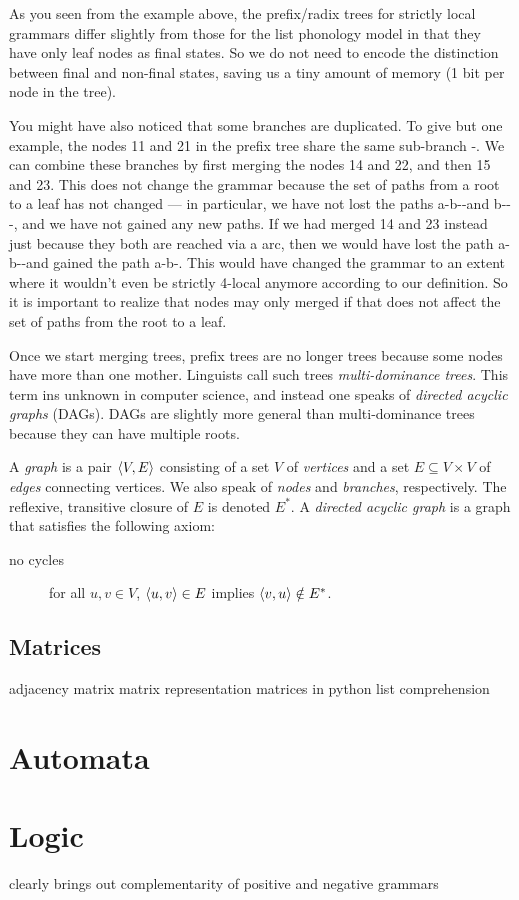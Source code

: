 As you seen from the example above, the prefix\slash radix trees for strictly local grammars differ slightly from those for the list phonology model in that they have only leaf nodes as final states.
So we do not need to encode the distinction between final and non-final states, saving us a tiny amount of memory (1 bit per node in the tree).

You might have also noticed that some branches are duplicated.
To give but one example, the nodes 11 and 21 in the prefix tree share the same sub-branch \RightEdge-\RightEdge.
We can combine these branches by first merging the nodes 14 and 22, and then 15 and 23.
This does not change the grammar because the set of paths from a root to a leaf has not changed --- in particular, we have not lost the paths a-b-\RightEdge-\RightEdge and b-\RightEdge-\RightEdge-\RightEdge, and we have not gained any new paths.
If we had merged 14 and 23 instead just because they both are reached via a \RightEdge arc, then we would have lost the path a-b-\RightEdge-\RightEdge and gained the path a-b-\RightEdge.
This would have changed the grammar to an extent where it wouldn't even be strictly 4-local anymore according to our definition.
So it is important to realize that nodes may only merged if that does not affect the set of paths from the root to a leaf.
%
\begin{examplebox}
    
\end{examplebox}

Once we start merging trees, prefix trees are no longer trees because some nodes have more than one mother.
Linguists call such trees \emph{multi-dominance trees}.
This term ins unknown in computer science, and instead one speaks of \emph{directed acyclic graphs} (DAGs).
DAGs are slightly more general than multi-dominance trees because they can have multiple roots.
%
\begin{definition}[DAG]
    A \emph{graph} is a pair $\left \langle V,E \right \rangle $ consisting of a set $V$ of \emph{vertices} and a set $E \subseteq V \times V $ of \emph{edges} connecting vertices.
    We also speak of \emph{nodes} and \emph{branches}, respectively.
    The reflexive, transitive closure of $E$ is denoted $E^*$.
    A \emph{directed acyclic graph} is a graph that satisfies the following axiom:
    \begin{description}
        \item[no cycles] for all $u,v \in V$, $\left \langle u,v \right \rangle  \in E$ implies $\left \langle v,u \right \rangle  \notin E^*$.
    \end{description}
\end{definition}

\subsection{Matrices}

adjacency matrix
matrix representation
matrices in python
    list comprehension

\section{Automata}

\section{Logic}
    clearly brings out complementarity of positive and negative grammars
